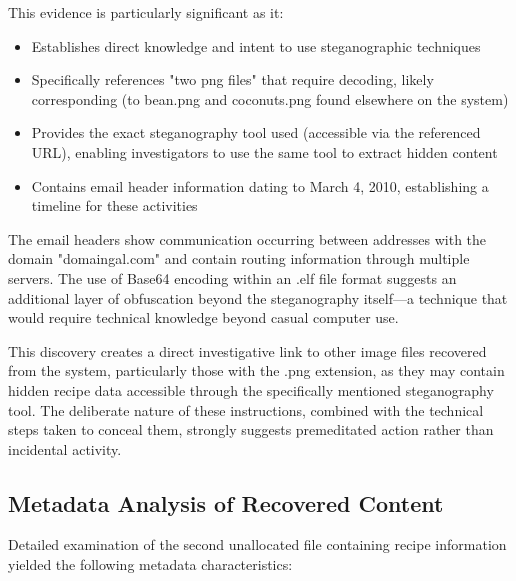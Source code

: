 This evidence is particularly significant as it:

\begin{itemize}
    \item Establishes direct knowledge and intent to use steganographic techniques
    \item Specifically references "two png files" that require decoding, likely corresponding (to bean.png and coconuts.png found elsewhere on the system)
    \item Provides the exact steganography tool used (accessible via the referenced URL), enabling investigators to use the same tool to extract hidden content
    \item Contains email header information dating to March 4, 2010, establishing a timeline for these activities
\end{itemize}

The email headers show communication occurring between addresses with the domain "domaingal.com" and contain routing information through multiple servers. The use of Base64 encoding within an .elf file format suggests an additional layer of obfuscation beyond the steganography itself—a technique that would require technical knowledge beyond casual computer use.

This discovery creates a direct investigative link to other image files recovered from the system, particularly those with the .png extension, as they may contain hidden recipe data accessible through the specifically mentioned steganography tool. The deliberate nature of these instructions, combined with the technical steps taken to conceal them, strongly suggests premeditated action rather than incidental activity.
\subsection{Metadata Analysis of Recovered Content}
Detailed examination of the second unallocated file containing recipe information yielded the following metadata characteristics:

